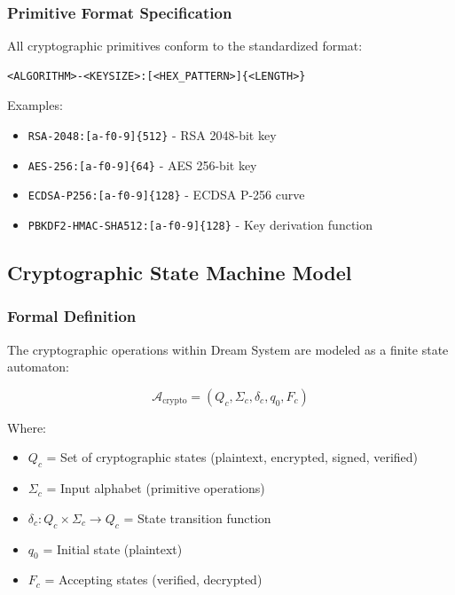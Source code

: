 \documentclass[12pt,a4paper]{article}
\begin{document}
\subsubsection{Primitive Format Specification}

All cryptographic primitives conform to the standardized format:

\begin{verbatim}
<ALGORITHM>-<KEYSIZE>:[<HEX_PATTERN>]{<LENGTH>}
\end{verbatim}

Examples:
\begin{itemize}
    \item \texttt{RSA-2048:[a-f0-9]\{512\}} - RSA 2048-bit key
    \item \texttt{AES-256:[a-f0-9]\{64\}} - AES 256-bit key
    \item \texttt{ECDSA-P256:[a-f0-9]\{128\}} - ECDSA P-256 curve
    \item \texttt{PBKDF2-HMAC-SHA512:[a-f0-9]\{128\}} - Key derivation function
\end{itemize}

\subsection{Cryptographic State Machine Model}

\subsubsection{Formal Definition}

The cryptographic operations within Dream System are modeled as a finite state automaton:

\begin{equation}
\mathcal{A}_{\text{crypto}} = (Q_c, \Sigma_c, \delta_c, q_0, F_c)
\end{equation}

Where:
\begin{itemize}
    \item $Q_c$ = Set of cryptographic states (plaintext, encrypted, signed, verified)
    \item $\Sigma_c$ = Input alphabet (primitive operations)
    \item $\delta_c : Q_c \times \Sigma_c \rightarrow Q_c$ = State transition function
    \item $q_0$ = Initial state (plaintext)
    \item $F_c$ = Accepting states (verified, decrypted)
\end{itemize}
\end{document}
